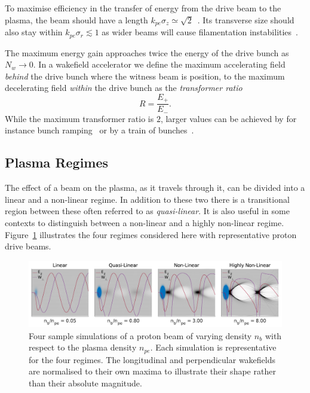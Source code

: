 To maximise efficiency in the transfer of energy from the drive beam to the plasma, the beam should have a length $k_{pe}\sigma_{z} \simeq \sqrt{2}$~\cite{lu:2005,lee:2000}. Its transverse size should also stay within $k_{pe}\sigma_{r} \lesssim 1$ as wider beams will cause filamentation instabilities~\cite{allen:2012,sentoku:2003}.

The maximum energy gain approaches twice the energy of the drive bunch as $N_{w} \to 0$. In a wakefield accelerator we define the maximum accelerating field \textit{behind} the drive bunch where the witness beam is position, to the maximum decelerating field \textit{within} the drive bunch as the \textit{transformer ratio}~\cite{muggli:2017}
\begin{equation}
    R = \frac{E_{+}}{E_{-}}. \label{EQ:TRat}
\end{equation}
While the maximum transformer ratio is $2$, larger values can be achieved by for instance bunch ramping~\cite{bane:1985} or by a train of bunches~\cite{jing:2006}.

\subsection{Plasma Regimes}
\label{Int:BPI:Reg}

The effect of a beam on the plasma, as it travels through it, can be divided into a linear and a non-linear regime. In addition to these two there is a transitional region between these often referred to as \textit{quasi-linear}. It is also useful in some contexts to distinguish between a non-linear and a highly non-linear regime. Figure~\ref{Fig:BPI:Regime} illustrates the four regimes considered here with representative proton drive beams.

\begin{figure}[hbt]
    \centering
    \includegraphics[width=1.0\linewidth]{figures/Regimes}
    \caption{\label{Fig:BPI:Regime} Four sample simulations of a proton beam of varying density $n_{b}$ with respect to the plasma density $n_{pe}$. Each simulation is representative for the four regimes. The longitudinal and perpendicular wakefields are normalised to their own maxima to illustrate their shape rather than their absolute magnitude.}
\end{figure}

